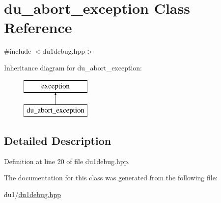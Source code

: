\hypertarget{classdu__abort__exception}{\section{du\-\_\-abort\-\_\-exception Class Reference}
\label{classdu__abort__exception}
}


{\ttfamily \#include $<$du1debug.\-hpp$>$}

Inheritance diagram for du\-\_\-abort\-\_\-exception\-:\begin{figure}[H]
\begin{center}
\leavevmode
\includegraphics[height=2.000000cm]{classdu__abort__exception}
\end{center}
\end{figure}


\subsection{Detailed Description}


Definition at line 20 of file du1debug.\-hpp.



The documentation for this class was generated from the following file\-:\begin{DoxyCompactItemize}
\item 
du1/\hyperlink{du1debug_8hpp}{du1debug.\-hpp}\end{DoxyCompactItemize}

